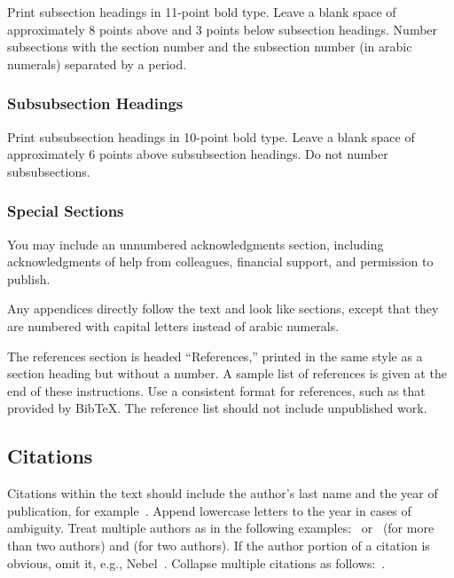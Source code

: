 \documentclass{article}
\theoremstyle{definition}
\begin{document}
Print subsection headings in 11-point bold type. Leave a blank space
of approximately 8 points above and 3 points below subsection
headings. Number subsections with the section number and the
subsection number (in arabic numerals) separated by a
period.

\subsubsection{Subsubsection Headings}

Print subsubsection headings in 10-point bold type. Leave a blank
space of approximately 6 points above subsubsection headings. Do not
number subsubsections.

\subsubsection{Special Sections}

You may include an unnumbered acknowledgments section, including
acknowledgments of help from colleagues, financial support, and
permission to publish.

Any appendices directly follow the text and look like sections, except
that they are numbered with capital letters instead of arabic
numerals.

The references section is headed ``References,'' printed in the same
style as a section heading but without a number. A sample list of
references is given at the end of these instructions. Use a consistent
format for references, such as that provided by Bib\TeX{}. The reference
list should not include unpublished work.

\subsection{Citations}

Citations within the text should include the author's last name and
the year of publication, for example~\cite{gottlob:nonmon}.  Append
lowercase letters to the year in cases of ambiguity.  Treat multiple
authors as in the following examples:~\cite{abelson-et-al:scheme}
or~\cite{bgf:Lixto} (for more than two authors) and
\cite{brachman-schmolze:kl-one} (for two authors).  If the author
portion of a citation is obvious, omit it, e.g.,
Nebel~.  Collapse multiple citations as
follows:~\cite{gls:hypertrees,levesque:functional-foundations}.
\nocite{abelson-et-al:scheme}
\nocite{bgf:Lixto}
\nocite{brachman-schmolze:kl-one}
\nocite{gottlob:nonmon}
\nocite{gls:hypertrees}
\nocite{levesque:functional-foundations}
\nocite{levesque:belief}
\nocite{nebel:jair-2000}
\end{document}
